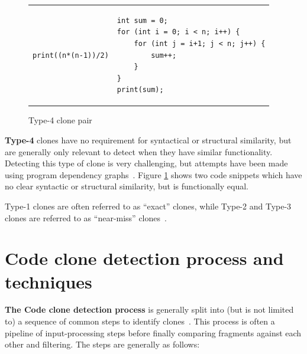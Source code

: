 \begin{figure}[t]
	\begin{center}
        \begin{tabular}{p{5cm} | p{5cm}}
			\begin{lstlisting}
print((n*(n-1))/2)
\end{lstlisting} &
			\begin{lstlisting}
int sum = 0;
for (int i = 0; i < n; i++) {
    for (int j = i+1; j < n; j++) {
        sum++;
    }
}
print(sum);
\end{lstlisting}
		\end{tabular}
	\end{center}
    \caption{Type-4 clone pair}
    \label{fig:type4clone}
\end{figure}



\textbf{Type-4} clones have no requirement for syntactical or structural similarity, but
are generally only relevant to detect when they have similar functionality. Detecting this
type of clone is very challenging, but attempts have been made using program dependency
graphs~\cite{SeedType4Detection}. Figure \ref{fig:type4clone} shows two code snippets
which have no clear syntactic or structural similarity, but is functionally equal.



Type-1 clones are often referred to as ``exact'' clones, while Type-2 and Type-3 clones
are referred to as ``near-miss'' clones~\cite[1]{Zibran_real_time_search}.

\section{Code clone detection process and techniques}

\textbf{The Code clone detection process} is generally split into (but is not limited to)
a sequence of common steps to identify clones~\cite{Inoue_introduction_to_cc}. This
process is often a pipeline of input-processing steps before finally comparing fragments
against each other and filtering. The steps are generally as follows:

